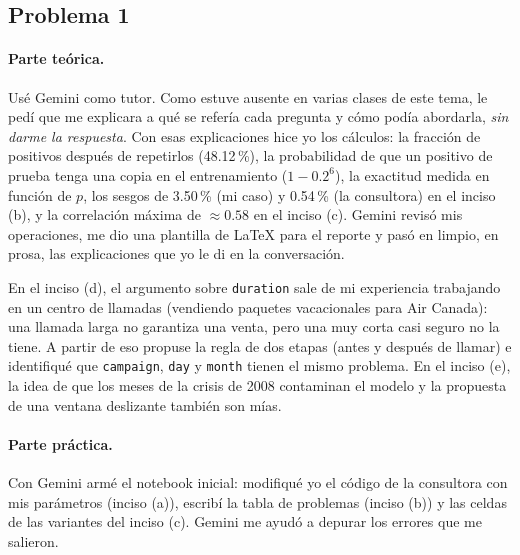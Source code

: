 \documentclass[11pt, letterpaper]{article}
\begin{document}
\subsection*{Problema 1}

\paragraph{Parte teórica.} Usé Gemini como tutor. Como estuve ausente en varias clases de este tema, le pedí que me explicara a qué se refería cada pregunta y cómo podía abordarla, \emph{sin darme la respuesta}. Con esas explicaciones hice yo los cálculos: la fracción de positivos después de repetirlos (48.12\,\%), la probabilidad de que un positivo de prueba tenga una copia en el entrenamiento ($1 - 0.2^6$), la exactitud medida en función de $p$, los sesgos de 3.50\,\% (mi caso) y 0.54\,\% (la consultora) en el inciso (b), y la correlación máxima de $\approx 0.58$ en el inciso (c). Gemini revisó mis operaciones, me dio una plantilla de \LaTeX{} para el reporte y pasó en limpio, en prosa, las explicaciones que yo le di en la conversación.

En el inciso (d), el argumento sobre \texttt{duration} sale de mi experiencia trabajando en un centro de llamadas (vendiendo paquetes vacacionales para Air Canada): una llamada larga no garantiza una venta, pero una muy corta casi seguro no la tiene. A partir de eso propuse la regla de dos etapas (antes y después de llamar) e identifiqué que \texttt{campaign}, \texttt{day} y \texttt{month} tienen el mismo problema. En el inciso (e), la idea de que los meses de la crisis de 2008 contaminan el modelo y la propuesta de una ventana deslizante también son mías.

\paragraph{Parte práctica.} Con Gemini armé el notebook inicial: modifiqué yo el código de la consultora con mis parámetros (inciso (a)), escribí la tabla de problemas (inciso (b)) y las celdas de las variantes del inciso (c). Gemini me ayudó a depurar los errores que me salieron.
\end{document}
